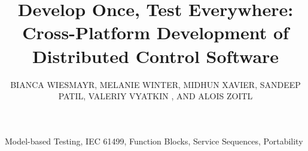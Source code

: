 \documentclass{ieeeojies}
\begin{document}
\title{Develop Once, Test Everywhere: Cross-Platform Development of Distributed Control Software}

\author{
\uppercase{Bianca Wiesmayr},
\uppercase{Melanie Winter},
\uppercase{Midhun Xavier},
\uppercase{Sandeep Patil},
\uppercase{Valeriy Vyatkin} ,
\uppercase{and Alois Zoitl} }

\address[1]{LIT CPS Lab, Johannes Kepler University Linz, Austria (e-mail: bianca.wiesmayr@jku.at)}
\address[2]{Luleå University of Technology, Luleå, Sweden (e-mails: midhun.xavier@ltu.se, sandeep.patil@ltu.se)}
\address[3]{CDL VaSiCS, LIT CPS Lab, Johannes Kepler University Linz, Austria (e-mail: alois.zoitl@jku.at)}
\address[4]{Aalto University, Helsinki, Finland (e-mail: Valeriy.Vyatkin@aalto.fi)}



\begin{abstract}

\end{abstract}

\begin{keywords}
Model-based Testing, IEC 61499, Function Blocks, Service Sequences, Portability
\end{keywords}

\setlength{\titlepgskip}{-15pt}

\maketitle











\end{document}
